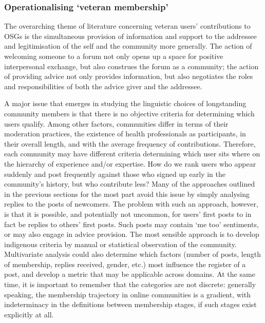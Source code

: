 
\subsubsection{Operationalising `veteran membership'} \label{sect:operat-vets}

The overarching theme of literature concerning veteran users' contributions to \glspl{OSG} is the simultaneous provision of information and support to the addressee and legitimisation of the self and the community more generally. The action of welcoming someone to a \gls{forum} not only opens up a space for positive interpersonal exchange, but also construes the \gls{forum} as a community; the action of providing advice not only provides information, but also negotiates the roles and responsibilities of both the advice giver and the addressee.

A major issue that emerges in studying the linguistic choices of longstanding community members is that there is no objective criteria for determining which users qualify. Among other factors, communities differ in terms of their moderation practices, the existence of health professionals as participants, in their overall length, and with the average frequency of contributions. Therefore, each community may have different criteria determining which user sits where on the hierarchy of experience and\slash or expertise. How do we rank users who appear suddenly and post frequently against those who signed up early in the community's history, but who contribute less? Many of the approaches outlined in the previous sections for the most part avoid this issue by simply analysing replies to the posts of newcomers. The problem with such an approach, however, is that it is possible, and potentially not uncommon, for users' first \glspl{post} to in fact be replies to others' first \glspl{post}. Such posts may contain `me too' sentiments, or may also engage in advice provision. The most sensible approach is to develop indigenous criteria by manual or statistical observation of the community. Multivariate analysis could also determine which factors (number of posts, length of membership, replies received, gender, etc.) most influence the register of a post, and develop a metric that may be applicable across domains. At the same time, it is important to remember that the categories are not discrete: generally speaking, the membership trajectory in online communities is a gradient, with indeterminacy in the definitions between membership stages, if such stages exist explicitly at all.

